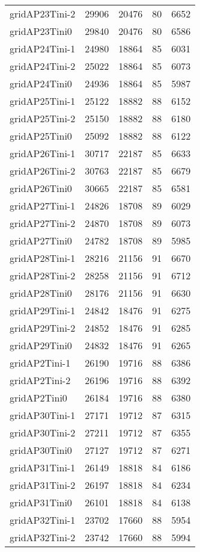 \begin{tabular}{lrrrr}
gridAP23Tini-2 & 29906 & 20476 & 80 & 6652 \\
gridAP23Tini0 & 29840 & 20476 & 80 & 6586 \\
gridAP24Tini-1 & 24980 & 18864 & 85 & 6031 \\
gridAP24Tini-2 & 25022 & 18864 & 85 & 6073 \\
gridAP24Tini0 & 24936 & 18864 & 85 & 5987 \\
gridAP25Tini-1 & 25122 & 18882 & 88 & 6152 \\
gridAP25Tini-2 & 25150 & 18882 & 88 & 6180 \\
gridAP25Tini0 & 25092 & 18882 & 88 & 6122 \\
gridAP26Tini-1 & 30717 & 22187 & 85 & 6633 \\
gridAP26Tini-2 & 30763 & 22187 & 85 & 6679 \\
gridAP26Tini0 & 30665 & 22187 & 85 & 6581 \\
gridAP27Tini-1 & 24826 & 18708 & 89 & 6029 \\
gridAP27Tini-2 & 24870 & 18708 & 89 & 6073 \\
gridAP27Tini0 & 24782 & 18708 & 89 & 5985 \\
gridAP28Tini-1 & 28216 & 21156 & 91 & 6670 \\
gridAP28Tini-2 & 28258 & 21156 & 91 & 6712 \\
gridAP28Tini0 & 28176 & 21156 & 91 & 6630 \\
gridAP29Tini-1 & 24842 & 18476 & 91 & 6275 \\
gridAP29Tini-2 & 24852 & 18476 & 91 & 6285 \\
gridAP29Tini0 & 24832 & 18476 & 91 & 6265 \\
gridAP2Tini-1 & 26190 & 19716 & 88 & 6386 \\
gridAP2Tini-2 & 26196 & 19716 & 88 & 6392 \\
gridAP2Tini0 & 26184 & 19716 & 88 & 6380 \\
gridAP30Tini-1 & 27171 & 19712 & 87 & 6315 \\
gridAP30Tini-2 & 27211 & 19712 & 87 & 6355 \\
gridAP30Tini0 & 27127 & 19712 & 87 & 6271 \\
gridAP31Tini-1 & 26149 & 18818 & 84 & 6186 \\
gridAP31Tini-2 & 26197 & 18818 & 84 & 6234 \\
gridAP31Tini0 & 26101 & 18818 & 84 & 6138 \\
gridAP32Tini-1 & 23702 & 17660 & 88 & 5954 \\
gridAP32Tini-2 & 23742 & 17660 & 88 & 5994 \\

\end{tabular}
